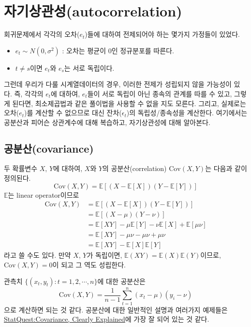 \documentclass{article}
\begin{document}
\section{자기상관성(autocorrelation)}
회귀문제에서 각각의 오차(\(e_t\))들에 대하여 전제되어야 하는 몇가지 가정들이 있었다.
\begin{itemize}
\item
\(e_t\sim N(0,\sigma^2)\) : 오차는 평균이 0인 정규분포를 따른다.
\item
\(t\neq s\)이면 \(e_t\)와 \(e_s\)는 서로 독립이다.
\end{itemize}
그런데 우리가 다룰 시계열데이터의 경우, 이러한 전제가 성립되지 않을 가능성이 있다.
즉, 각각의 \(e_t\)에 대하여, \(e_t\)들이 서로 독립이 아닌 종속의 관계를 따를 수 있고, 그렇게 된다면, 최소제곱법과 같은 풀이법을 사용할 수 없을 지도 모른다.
그리고, 실제로는 오차(\(e_t\))를 계산할 수 없으므로 대신 잔차(\(\epsilon_t\))의 독립성/종속성을 계산한다.
여기에서는 공분산과 피어슨 상관계수에 대해 복습하고, 자기상관성에 대해 알아본다.

\subsection{공분산(covariance)}
두 확률변수 \(X\), \(Y\)에 대하여, \(X\)와 \(Y\)의 공분산(correlation) \(\text{Cov}(X,Y)\)는  다음과 같이 정의된다.
\begin{equation}
\text{Cov}(X,Y)=\mathbb E[(X-\mathbb E[X])(Y-\mathbb E[Y])]
\end{equation}
\(\mathbb E\)는 linear operator이므로
\begin{align*}
\text{Cov}(X,Y)
&=\mathbb E[(X-\mathbb E[X])(Y-\mathbb E[Y])]\\
&=\mathbb E[(X-\mu)(Y-\nu)]\\
&=\mathbb E[XY]-\mu\mathbb E[Y]-\nu\mathbb E[X]+\mathbb E[\mu\nu]\\
&=\mathbb E[XY]-\mu\nu-\mu\nu+\mu\nu\\
&=\mathbb E[XY]-\mathbb E[X]\mathbb E[Y]
\end{align*}
라고 쓸 수도 있다.
만약 \(X\), \(Y\)가 독립이면, \(\mathbb E(XY)=\mathbb E(X)\mathbb E(Y)\)이므로, \(\text{Cov}(X,Y)=0\)이 되고 그 역도 성립한다.

관측치 \(\{(x_t, y_t):t=1,2,\cdots,n\}\)에 대한 공분산은
\[\text{Cov}(X,Y)=\frac1{n-1}\sum_{t=1}^n(x_t-\mu)(y_i-\nu)\]
으로 계산하면 되는 것 같다.
공분산에 대한 일반적인 설명과 여러가지 예제들은 \href{https://youtu.be/qtaqvPAeEJY}{StatQuest:Covariance, Clearly Explained}에 가장 잘 되어 있는 것 같다.
\end{document}
